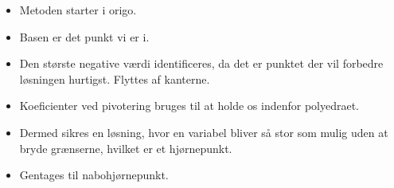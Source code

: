 \begin{frame}
\begin{itemize}


\item Metoden starter i origo.
\item Basen er det punkt vi er i.
\item Den største negative værdi identificeres, da det er punktet der vil forbedre løsningen hurtigst. Flyttes af kanterne. 
\item Koeficienter ved pivotering bruges til at holde os indenfor polyedraet.
\item  Dermed sikres en løsning, hvor en variabel bliver så stor som mulig uden at bryde grænserne, hvilket er et hjørnepunkt.
\item Gentages til nabohjørnepunkt.
\end{itemize}
\end{frame}